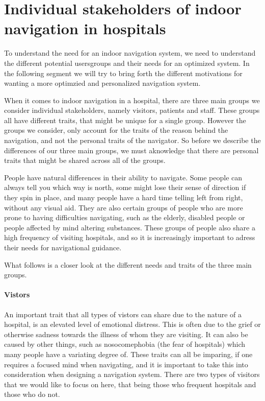 \section{Individual stakeholders of indoor navigation in hospitals} %
\label{sec:interusers}

To understand the need for an indoor navigation system, we need to understand the different potential usersgroups and their needs for an optimized system. In the following segment we will try to bring forth the different motivations for wanting a more optimzied and personalized navigation system.

When it comes to indoor navigation in a hospital, there are three main groups we consider individual stakeholders, namely visitors, patients and staff. These groups all have different traits, that might be unique for a single group. However the groups we consider, only account for the traits of the reason behind the navigation, and not the personal traits of the navigator. So before we describe the differences of our three main groups, we must aknowledge that there are personal traits that might be shared across all of the groups.

People have natural differences in their ability to navigate. Some people can always tell you which way is north, some might lose their sense of direction if they spin in place, and many people have a hard time telling left from right, without any visual aid. They are also certain groups of people who are more prone to having difficulties navigating, such as the elderly, disabled people or people affected by mind altering substances. These groups of people also share a high frequency of visiting hospitals, and so it is increasingly important to adress their needs for navigational guidance.

What follows is a closer look at the different needs and traits of the three main groups.

\paragraph{Vistors} %
 \label{par:vistors}
 

An important trait that all types of vistors can share due to the nature of a hospital, is an elevated level of emotional distress. This is often due to the grief or otherwise sadness towards the illness of whom they are visiting. It can also be caused by other things, such as nosocomephobia (the fear of hospitals) which many people have a variating degree of. These traits can all be imparing, if one requires a focused mind when navigating, and it is important to take this into consideration when designing a navigation system. There are two types of visitors that we would like to focus on here, that being those who frequent hospitals and those who do not.

